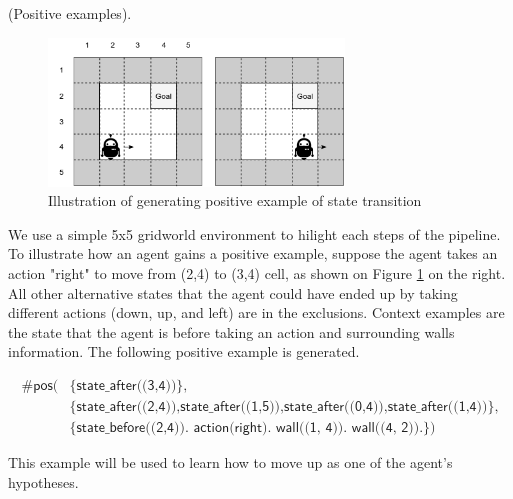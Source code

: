 \begin{examp} \normalfont (Positive examples).


\begin{figure}[!htb]
\centering
\includegraphics[width=0.7\textwidth]{./figures/pipeline_example1}
\caption{Illustration of generating positive example of state transition}
\label{example_pos_example}
\end{figure}

We use a simple 5x5 gridworld environment to hilight each steps of the pipeline. To illustrate how an agent gains a positive example, suppose the agent takes an action "right" to move from (2,4) to (3,4) cell, as shown on Figure \ref{example_pos_example} on the right.
All other alternative states that the agent could have ended up by taking different actions
(down, up, and left) are in the exclusions.
Context examples are the state that the agent is before taking an action and surrounding walls information. The following positive example is generated.

\begin{equation}
\begin{split}
    \textsf{\#pos(} & \textsf{\{state\_after((3,4))\},}\\
                    & \textsf{\{state\_after((2,4)),state\_after((1,5)),state\_after((0,4)),state\_after((1,4))\},} \\
    & \textsf{\{state\_before((2,4)). action(right). wall((1, 4)). wall((4, 2)).\})}
\end{split}
\end{equation}

This example will be used to learn how to move up as one of the agent's hypotheses.


\end{examp}
